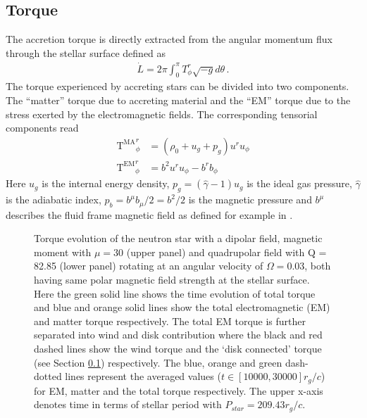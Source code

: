 \documentclass[fleqn,usenatbib]{mnras}
\begin{document}
\subsection{Torque}\label{sec:torque}
The accretion torque is directly extracted from the angular momentum flux through the stellar surface defined as
\begin{align}
    \dot{L} = 2\pi\int_0^\pi T^r_{\phi} \sqrt{-g}d\theta \, .\label{eq:ldot}
\end{align}
The torque experienced by accreting stars can be divided into two components. The ``matter'' torque due to accreting material and the ``EM'' torque due to the stress exerted by the electromagnetic fields. The corresponding tensorial components read
\begin{align}
{\text{T}^{\text{MA}}}^{r}_{\phi} &= (\rho_0 + u_g + p_g)u^{r}u_{\phi}  \\
{\text{T}^{\text{EM}}}^r_{\phi} &= b^2u^{r}u_{\phi} - b^{r}b_{\phi}
\label{angularmomentum}
\end{align}
Here $u_g$ is the internal energy density, $p_g = (\hat{\gamma} - 1)u_g$ is the ideal gas pressure, $\hat{\gamma}$ is the adiabatic index, $p_b = b^{\mu}b_{\mu}/2 = b^2/2$ is the magnetic pressure and $b^{\mu}$ describes the fluid frame magnetic field as defined for example in \cite{Porth2017}.
\begin{figure*}
   \centering
    \caption{Torque evolution of the neutron star with a dipolar field, magnetic moment with $\mu = 30$ (upper panel) and quadrupolar field with Q = 82.85 (lower panel) rotating at an angular velocity of $\Omega=0.03$, both having same polar magnetic field strength at the stellar surface. Here the green solid line shows the time evolution of total torque and blue and orange solid lines show the total electromagnetic (EM) and matter torque respectively. The total EM torque is further separated into wind and disk contribution where the black and red dashed lines show the wind torque and the `disk connected' torque (see Section \ref{sec:torque}) respectively. The blue, orange and green dash-dotted lines represent the averaged values ($t \in [10000,30000]r_g/c$) for EM, matter and the total torque respectively. The upper x-axis denotes time in terms of stellar period with $P_{star} = 209.43 r_g/c$.}%
    \label{fig:torque_dipole}
\end{figure*}
\end{document}
